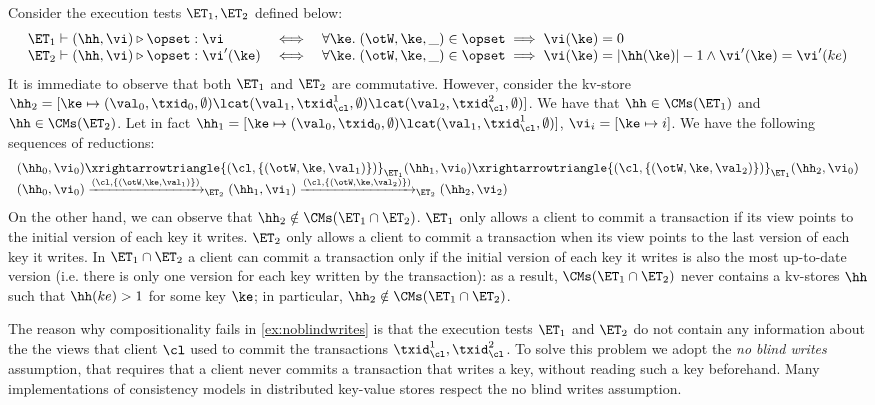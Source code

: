 \begin{example}
\label{ex:noblindwrites}
Consider the execution tests $\ET_1, \ET_2$ defined below: 
\[
\begin{array}{lcl}
\ET_1 \vdash (\hh, \vi) \triangleright \opset : \vi &\iff& 
\forall \ke.\;(\otW, \ke, \_) \in \opset \implies \vi(\ke) = 0\\
\ET_2 \vdash (\hh, \vi) \triangleright \opset : \vi'(\ke) &\iff& 
\forall \ke. \;(\otW, \ke, \_ ) \in \opset \implies \vi(\ke) = \lvert \hh(\ke) \rvert - 1 \wedge \vi'(\ke) = \vi'(ke)\\
\end{array}
\]
It is immediate to observe that both $\ET_1$ and $\ET_2$ are commutative. However, 
consider the kv-store $\hh_2 = [\ke \mapsto (\val_0, \txid_0, \emptyset) \lcat (\val_1, \txid_{\cl}^1, \emptyset) \lcat (\val_2, \txid_{\cl}^2, \emptyset)]$. 
We have that $\hh \in \CMs(\ET_1)$ and $\hh \in \CMs(\ET_2)$.
Let in fact $\hh_1 = [\ke \mapsto (\val_0, \txid_0, \emptyset) \lcat (\val_1, \txid_{\cl}^1, \emptyset)]$, $\vi_{i} = [\ke \mapsto i]$.
We have the following sequences of reductions: 
\[
\begin{array}{l}
(\hh_0, \vi_0) \xrightarrowtriangle{(\cl, \{(\otW, \ke, \val_1)\})}_{\ET_1} 
(\hh_1, \vi_0) \xrightarrowtriangle{(\cl,\{(\otW, \ke, \val_2)\})}_{\ET_1} (\hh_2, \vi_0)\\
(\hh_0, \vi_0) \xrightarrow{(\cl, \{(\otW, \ke, \val_1)\})}_{\ET_2} (\hh_1, \vi_1) \xrightarrow{(\cl, \{(\otW, \ke, \val_2)\})}_{\ET_2} 
(\hh_2, \vi_2)
\end{array}
\]
On the other hand, we can observe that $\hh_2 \notin \CMs(\ET_1 \cap \ET_2)$. $\ET_1$ only allows a client to 
commit a transaction if its view points to the initial version of each key it writes. $\ET_2$ only allows a client 
to commit a transaction when its view points to the last version of each key it writes. In $\ET_1 \cap \ET_2$ 
a client can commit a transaction only if the initial version of each key it writes is also the most up-to-date version 
(i.e. there is only one version for each key written by the transaction): as a result, $\CMs(\ET_1 \cap \ET_2)$ 
never contains a  kv-stores $\hh$ such that $\hh(ke) > 1$ for some key $\ke$; in particular, $\hh_2 \notin \CMs(\ET_1 \cap \ET_2)$.
\end{example}

The reason why compositionality fails in \cref{ex:noblindwrites} is that the execution tests $\ET_1$ and $\ET_2$ do not contain 
any information about the the views that client $\cl$ used to commit the transactions $\txid_{\cl}^1, \txid_{\cl}^2$. 
To solve this problem we adopt the \emph{no blind writes} assumption, that requires that a client never commits 
a transaction that writes a key, without reading such a key beforehand. Many implementations of consistency models 
in distributed key-value stores respect the no blind writes assumption. 

